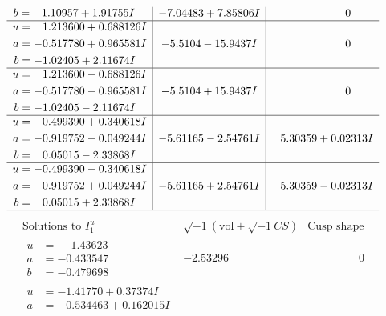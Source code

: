 \documentclass[1p]{elsarticle_modified}
\theoremstyle{definition}
\newcommand{\I}{\sqrt{-1}}
\begin{document}
$$\begin{array}{c|c|c}
\begin{aligned}
b &= \phantom{-}1.10957 + 1.91755 I\end{aligned}
 & -7.04483 + 7.85806 I & \phantom{-0.000000 } 0 \\ \hline\begin{aligned}
u &= \phantom{-}1.213600 + 0.688126 I \\
a &= -0.517780 + 0.965581 I \\
b &= -1.02405 + 2.11674 I\end{aligned}
 & -5.5104 - 15.9437 I & \phantom{-0.000000 } 0 \\ \hline\begin{aligned}
u &= \phantom{-}1.213600 - 0.688126 I \\
a &= -0.517780 - 0.965581 I \\
b &= -1.02405 - 2.11674 I\end{aligned}
 & -5.5104 + 15.9437 I & \phantom{-0.000000 } 0 \\ \hline\begin{aligned}
u &= -0.499390 + 0.340618 I \\
a &= -0.919752 - 0.049244 I \\
b &= \phantom{-}0.05015 - 2.33868 I\end{aligned}
 & -5.61165 - 2.54761 I & \phantom{-}5.30359 + 0.02313 I \\ \hline\begin{aligned}
u &= -0.499390 - 0.340618 I \\
a &= -0.919752 + 0.049244 I \\
b &= \phantom{-}0.05015 + 2.33868 I\end{aligned}
 & -5.61165 + 2.54761 I & \phantom{-}5.30359 - 0.02313 I\\
 \hline 
 \end{array}$$\newpage$$\begin{array}{c|c|c}  
\text{Solutions to }I^u_{1}& \I (\text{vol} + \sqrt{-1}CS) & \text{Cusp shape}\\
 \hline 
\begin{aligned}
u &= \phantom{-}1.43623\phantom{ +0.000000I} \\
a &= -0.433547\phantom{ +0.000000I} \\
b &= -0.479698\phantom{ +0.000000I}\end{aligned}
 & -2.53296\phantom{ +0.000000I} & \phantom{-0.000000 } 0 \\ \hline\begin{aligned}
u &= -1.41770 + 0.37374 I \\
a &= -0.534463 + 0.162015 I \\

\end{aligned}
\end{array}$$
\end{document}
